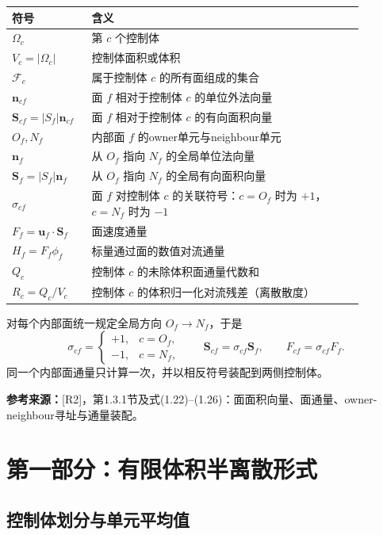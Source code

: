 \documentclass[UTF8,12pt,a4paper]{ctexart}
\numberwithin{equation}{section}
\newcommand{\Rtwo}{\textnormal{[R2]}}
\newcommand{\source}[1]{%
  \par\smallskip
  \noindent\colorbox{sourcebg}{%
    \parbox{0.955\linewidth}{\footnotesize\color{sourcegray}\textbf{参考来源：}#1}%
  }
  \par\smallskip
}
\begin{document}
\begin{longtable}{>{\centering\arraybackslash}p{0.18\linewidth}p{0.70\linewidth}}
\toprule
符号 & 含义\\
\midrule
$\Omega_c$ & 第 $c$ 个控制体\\
$V_c=|\Omega_c|$ & 控制体面积或体积\\
$\mathcal F_c$ & 属于控制体 $c$ 的所有面组成的集合\\
$\bm n_{cf}$ & 面 $f$ 相对于控制体 $c$ 的单位外法向量\\
$\bm S_{cf}=|S_f|\bm n_{cf}$ & 面 $f$ 相对于控制体 $c$ 的有向面积向量\\
$O_f,N_f$ & 内部面 $f$ 的owner单元与neighbour单元\\
$\bm n_f$ & 从 $O_f$ 指向 $N_f$ 的全局单位法向量\\
$\bm S_f=|S_f|\bm n_f$ & 从 $O_f$ 指向 $N_f$ 的全局有向面积向量\\
$\sigma_{cf}$ & 面 $f$ 对控制体 $c$ 的关联符号：$c=O_f$ 时为 $+1$，$c=N_f$ 时为 $-1$\\
$F_f=\bm u_f\cdot\bm S_f$ & 面速度通量\\
$H_f=F_f\phi_f$ & 标量通过面的数值对流通量\\
$Q_c$ & 控制体 $c$ 的未除体积面通量代数和\\
$R_c=Q_c/V_c$ & 控制体 $c$ 的体积归一化对流残差（离散散度）\\
\bottomrule
\end{longtable}

对每个内部面统一规定全局方向 $O_f\to N_f$，于是
\begin{equation}
  \boxed{
  \sigma_{cf}=
  \begin{cases}
    +1,&c=O_f,\\
    -1,&c=N_f,
  \end{cases}
  \qquad
  \bm S_{cf}=\sigma_{cf}\bm S_f,
  \qquad
  F_{cf}=\sigma_{cf}F_f.}
  \label{eq:orientation_relation}
\end{equation}
同一个内部面通量只计算一次，并以相反符号装配到两侧控制体。

\source{\Rtwo，第1.3.1节及式(1.22)--(1.26)：面面积向量、面通量、owner-neighbour寻址与通量装配。}

\newpage
\section{第一部分：有限体积半离散形式}

\subsection{控制体划分与单元平均值}
\end{document}
